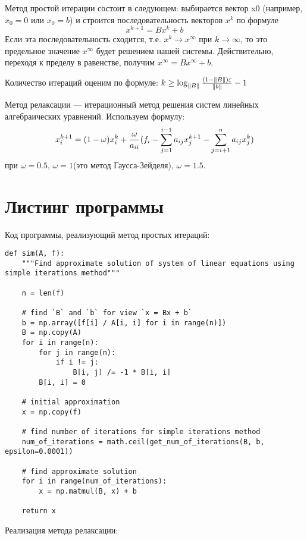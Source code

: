 \documentclass[12pt]{report}
\begin{document}
Метод простой итерации состоит в следующем: выбирается вектор x0
(например, $x_{0} = 0$ или $x_{0} = b$) и строится последовательность векторов $x^k$ по формуле \[x^{k+1} = Bx^k + b\] Если эта последовательность сходится, т.е. $x^{k} \rightarrow x^{\infty}$ при $k \rightarrow \infty$, то это предельное
значение $x^{\infty}$ будет решением нашей системы. Действительно, переходя к
пределу в равенстве, получим $x^{\infty} = Bx^{\infty} + b$.

Количество итераций оценим по формуле: $k \geq \log_{\|B\|} 
{{(1 - \|B\|)\varepsilon}\over{\|b\|}} - 1$

Метод релаксации — итерационный метод решения систем линейных алгебраических уравнений. Используем формулу:
\[
x_{i}^{k+1} = (1 - \omega)x_{i}^k + {{\omega}\over{a_{ii}}} (f_{i} - \sum_{j=1}^{i-1} a_{ij}x_{j}^{k+1} - \sum_{j=i+1}^{n} a_{ij}x_{j}^k)
\]
при $\omega = 0.5$, $\omega=1$(это метод Гаусса-Зейделя), $\omega=1.5$.

\section{Листинг программы}

\lstset{language=Python}
\lstset{extendedchars=\true}

Код программы, реализующий метод простых итераций: 

\begin{lstlisting}
def sim(A, f):
    """Find approximate solution of system of linear equations using simple iterations method"""

    n = len(f)

    # find `B` and `b` for view `x = Bx + b`
    b = np.array([f[i] / A[i, i] for i in range(n)])
    B = np.copy(A)
    for i in range(n):
        for j in range(n):
            if i != j:
                B[i, j] /= -1 * B[i, i]
        B[i, i] = 0

    # initial approximation
    x = np.copy(f)

    # find number of iterations for simple iterations method
    num_of_iterations = math.ceil(get_num_of_iterations(B, b, epsilon=0.0001))

    # find approximate solution
    for i in range(num_of_iterations):
        x = np.matmul(B, x) + b

    return x
\end{lstlisting}

Реализация метода релаксации:
\end{document}
